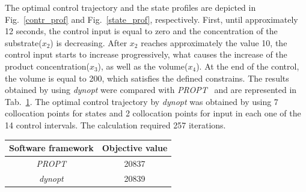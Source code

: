The optimal control trajectory and the state profiles are depicted in
Fig.~\ref{contr_prof} and Fig.~\ref{state_prof}, respectively. First,
until approximately 12 seconds, the control input is equal to zero and
the concentration of the substrate($x_2$) is decreasing. After $x_2$ reaches approximately the value 10, the control input starts
to increase progressively, what causes the increase of the product
concentration($x_3$), as well as the volume($x_4$). At the end of the control, the
volume is equal to 200, which satisfies the defined constrains. The
results obtained by using \textit{dynopt} were compared with
\textit{PROPT}~\cite{rut10} and are represented in
Tab.~\ref{tab:compar}. The optimal control trajectory by \textit{dynopt} was obtained by using 7 collocation points for states and 2 collocation points for input in each one of the 14 control intervals. The calculation required 257 iterations.

\begin{table}[t]
	\centering
	\begin{tabular}{c|c}
		Software framework & Objective value \\ \hline
		\textit{PROPT} & 20837 \\
		\textit{dynopt} & 20839		
	\end{tabular}
	\label{tab:compar}
\end{table}

